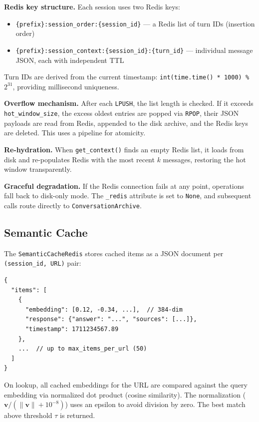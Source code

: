 \documentclass[conference]{IEEEtran}
\begin{document}
\textbf{Redis key structure.} Each session uses two Redis keys:
\begin{itemize}
\item \texttt{\{prefix\}:session\_order:\{session\_id\}} --- a Redis list of turn IDs (insertion order)
\item \texttt{\{prefix\}:session\_context:\{session\_id\}:\{turn\_id\}} --- individual message JSON, each with independent TTL
\end{itemize}

Turn IDs are derived from the current timestamp: \texttt{int(time.time() * 1000) \% $2^{31}$}, providing millisecond uniqueness.

\textbf{Overflow mechanism.} After each \texttt{LPUSH}, the list length is checked. If it exceeds \texttt{hot\_window\_size}, the excess oldest entries are popped via \texttt{RPOP}, their JSON payloads are read from Redis, appended to the disk archive, and the Redis keys are deleted. This uses a pipeline for atomicity.

\textbf{Re-hydration.} When \texttt{get\_context()} finds an empty Redis list, it loads from disk and re-populates Redis with the most recent $k$ messages, restoring the hot window transparently.

\textbf{Graceful degradation.} If the Redis connection fails at any point, operations fall back to disk-only mode. The \texttt{\_redis} attribute is set to \texttt{None}, and subsequent calls route directly to \texttt{ConversationArchive}.

\subsection{Semantic Cache}

The \texttt{SemanticCacheRedis} stores cached items as a JSON document per \texttt{(session\_id, URL)} pair:

\begin{lstlisting}[caption={Semantic cache Redis value structure},label=lst:semcache]
{
  "items": [
    {
      "embedding": [0.12, -0.34, ...],  // 384-dim
      "response": {"answer": "...", "sources": [...]},
      "timestamp": 1711234567.89
    },
    ...  // up to max_items_per_url (50)
  ]
}
\end{lstlisting}

On lookup, all cached embeddings for the URL are compared against the query embedding via normalized dot product (cosine similarity). The normalization ($\mathbf{v} / (\|\mathbf{v}\| + 10^{-8})$) uses an epsilon to avoid division by zero. The best match above threshold $\tau$ is returned.
\end{document}
